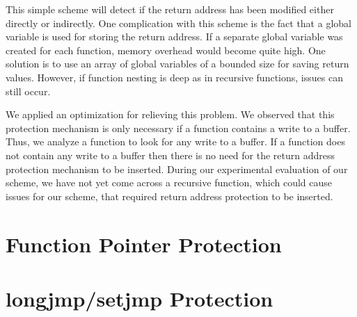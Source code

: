 This simple scheme will detect if the return address has been modified either directly or
indirectly. One complication with this scheme is the fact that a global variable is used for storing
the return address. If a separate global variable was created for each function, memory overhead
would become quite high. One solution is to use an array of global variables of a bounded size for
saving return values. However, if function nesting is deep as in recursive functions, issues can
still occur.

We applied an optimization for relieving this problem. We observed that this protection mechanism is
only necessary if a function contains a write to a buffer. Thus, we analyze a function to look for
any write to a buffer. If a function does not contain any write to a buffer then there is no need
for the return address protection mechanism to be inserted. During our experimental evaluation of
our scheme, we have not yet come across a recursive function, which could cause issues for our
scheme, that required return address protection to be inserted.

\section{Function Pointer Protection}

\section{longjmp/setjmp Protection}
